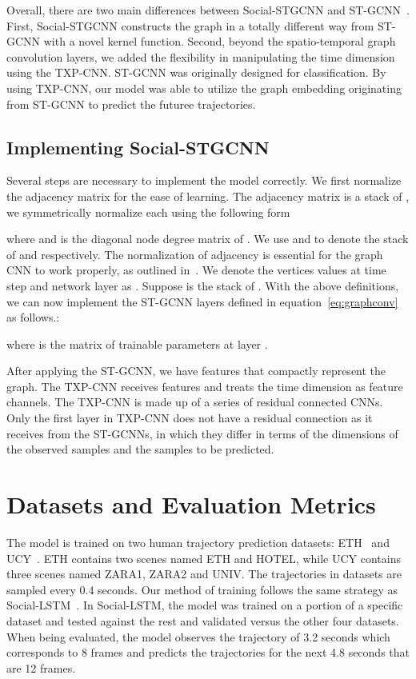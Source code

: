 \documentclass[10pt,twocolumn,letterpaper]{article}
\newcommand*{\ours}{Social-STGCNN }
\begin{document}
Overall, there are two main differences between \ours and ST-GCNN~\cite{yan2018spatial}. First, \ours constructs the graph in a totally different way from ST-GCNN with a novel kernel function. Second, beyond the spatio-temporal graph convolution layers, we added the flexibility in manipulating the time dimension using the TXP-CNN. ST-GCNN was originally designed for classification. By using TXP-CNN, our model was able to utilize the graph embedding originating from ST-GCNN to predict the futuree trajectories.

\subsection{Implementing \ours }
Several steps are necessary to implement the model correctly. We first normalize the adjacency matrix for the ease of learning. The adjacency matrix  is a stack of , we symmetrically normalize each  using the following form~\cite{kipf2016semi} 

where  and  is the diagonal node degree matrix of . We use  and  to denote the stack of  and  respectively. The normalization of adjacency is essential for the graph CNN to work properly, as outlined in~\cite{kipf2016semi}. 
We denote the vertices values at time step  and network layer  as . Suppose  is the stack of . With the above definitions, we can now implement the ST-GCNN layers defined in equation~\ref{eq:graphconv} as follows.:

where  is the matrix of trainable parameters at layer .

After applying the ST-GCNN, we have features that compactly represent the graph. The TXP-CNN receives features  and treats the time dimension as feature channels. The TXP-CNN is made up of a series of residual connected CNNs. Only the first layer in TXP-CNN does not have a residual connection as it receives  from the ST-GCNNs, in which they differ in terms of the dimensions of the observed samples and the samples to be predicted. 


\section{Datasets and Evaluation Metrics}
The model is trained on two human trajectory prediction datasets: ETH~\cite{pellegrini2009you} and UCY~\cite{lerner2007crowds}. ETH contains two scenes named ETH and HOTEL, while UCY contains three scenes named ZARA1, ZARA2 and UNIV. The trajectories in datasets are sampled every 0.4 seconds. Our method of training follows the same strategy as Social-LSTM~\cite{alahi2016social}. In Social-LSTM, the model was trained on a portion of a specific dataset and tested against the rest and validated versus the other four datasets. When being evaluated, the model observes the trajectory of 3.2 seconds which corresponds to 8 frames and predicts the trajectories for the next 4.8 seconds that are 12 frames.
\end{document}
